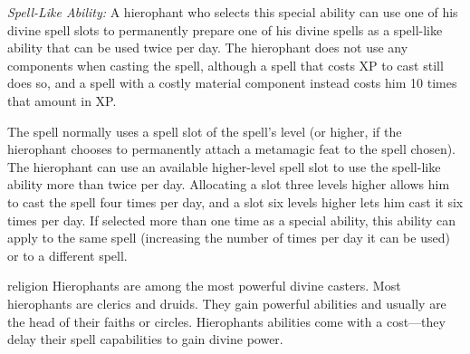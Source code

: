{\textit{Spell-Like Ability:} A hierophant who selects this special ability can use one of his divine spell slots to permanently prepare one of his divine spells as a spell-like ability that can be used twice per day. The hierophant does not use any components when casting the spell, although a spell that costs XP to cast still does so, and a spell with a costly material component instead costs him 10 times that amount in XP.

The spell normally uses a spell slot of the spell's level (or higher, if the hierophant chooses to permanently attach a metamagic feat to the spell chosen). The hierophant can use an available higher-level spell slot to use the spell-like ability more than twice per day. Allocating a slot three levels higher allows him to cast the spell four times per day, and a slot six levels higher lets him cast it six times per day. If selected more than one time as a special ability, this ability can apply to the same spell (increasing the number of times per day it can be used) or to a different spell.
}
{}
{religion}
{Hierophants are among the most powerful divine casters.}
{Most hierophants are clerics and druids. They gain powerful abilities and usually are the head of their faiths or circles.}
{Hierophants abilities come with a cost---they delay their spell capabilities to gain divine power.}